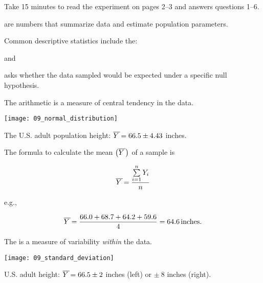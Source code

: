 \documentclass[t]{beamer}
\newcommand*\meanY{\overline{Y\kern1.67pt}\kern-1.67pt}
\begin{document}
%
\begin{frame}[t]{Take 15 minutes to read the experiment on pages 2–3 and answers questions 1–6.}

\end{frame}
%
\begin{frame}[t]{ are numbers that summarize data and estimate population parameters.}

\hangpara Common descriptive statistics include the:

\hangpara \hspace{1em} 

\hangpara \hspace{1em}  and

\hangpara \hspace{1em} 

\end{frame}
%
\begin{frame}{ asks whether the data sampled would be expected under a specific null hypothesis.}

\end{frame}
%
{
\begin{frame}[t]{The arithmetic  is a measure of central tendency in the data.}

	\vspace*{-\baselineskip}
	
	{\centering 
	\texttt{[image: 09\_normal\_distribution]} \par
	}
	
	\hangpara The U.S. adult population height: $\meanY = 66.5 \pm 4.43$ inches.
	
\end{frame}
}
%
\begin{frame}[t]{The formula to calculate the mean $\left(\meanY\kern1.67pt\right)$ of a sample is}

{\Large
\[ \meanY = \frac{\sum\limits^n_{i=1} Y_i}{n} \]
}

\pause\hangpara e.g.,

\[ \meanY = \frac{66.0 + 68.7 + 64.2 + 59.6}{4} = 64.6\,\mathrm{inches.} \]

\end{frame}
%
\begin{frame}[t]{The  is a measure of variability \emph{within} the data.}

	\vspace*{-0.5\baselineskip}
	
	{\centering 
	\texttt{[image: 09\_standard\_deviation]} \par
	}
	
	\hangpara U.S. adult height: $\meanY = 66.5 \pm 2$ inches (left) or $ \pm\ 8$ inches (right). 
	
\end{frame}
\end{document}
